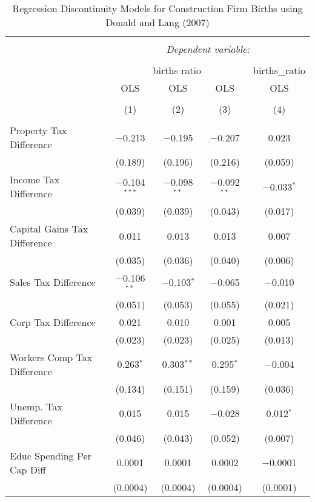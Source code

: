 
\begin{table}[!htbp] \centering 
  \caption{Regression Discontinuity Models for  Construction Firm Births using Donald and Lang (2007)} 
  \label{} 
\begin{tabular}{@{\extracolsep{5pt}}lcccc} 
\\[-1.8ex]\hline 
\hline \\[-1.8ex] 
 & \multicolumn{4}{c}{\textit{Dependent variable:}} \\ 
\cline{2-5} 
\\[-1.8ex] & \multicolumn{3}{c}{births ratio} & births\_ratio \\ 
 & OLS & OLS & OLS & OLS \\ 
\\[-1.8ex] & (1) & (2) & (3) & (4)\\ 
\hline \\[-1.8ex] 
 Property Tax Difference & $-$0.213 & $-$0.195 & $-$0.207 & 0.023 \\ 
  & (0.189) & (0.196) & (0.216) & (0.059) \\ 
  Income Tax Difference & $-$0.104$^{***}$ & $-$0.098$^{**}$ & $-$0.092$^{**}$ & $-$0.033$^{*}$ \\ 
  & (0.039) & (0.039) & (0.043) & (0.017) \\ 
  Capital Gains Tax Difference & 0.011 & 0.013 & 0.013 & 0.007 \\ 
  & (0.035) & (0.036) & (0.040) & (0.006) \\ 
  Sales Tax Difference & $-$0.106$^{**}$ & $-$0.103$^{*}$ & $-$0.065 & $-$0.010 \\ 
  & (0.051) & (0.053) & (0.055) & (0.021) \\ 
  Corp Tax Difference & 0.021 & 0.010 & 0.001 & 0.005 \\ 
  & (0.023) & (0.023) & (0.025) & (0.013) \\ 
  Workers Comp Tax Difference & 0.263$^{*}$ & 0.303$^{**}$ & 0.295$^{*}$ & $-$0.004 \\ 
  & (0.134) & (0.151) & (0.159) & (0.036) \\ 
  Unemp. Tax Difference & 0.015 & 0.015 & $-$0.028 & 0.012$^{*}$ \\ 
  & (0.046) & (0.043) & (0.052) & (0.007) \\ 
  Educ Spending Per Cap Diff & 0.0001 & 0.0001 & 0.0002 & $-$0.0001 \\ 
  & (0.0004) & (0.0004) & (0.0004) & (0.0001) \\ 

\end{tabular}
\end{table}
